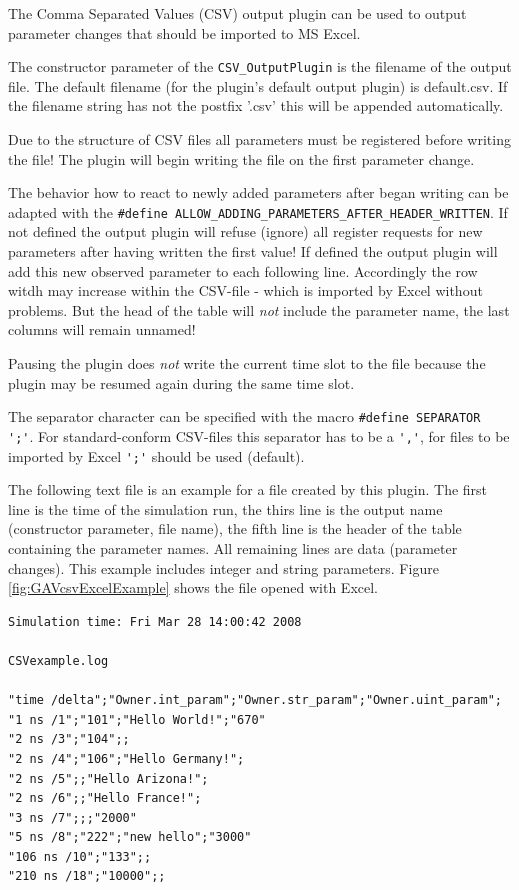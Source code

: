 The Comma Separated Values (CSV) output plugin can be used to output parameter changes that should be imported to MS Excel.

The constructor parameter of the \lstinline|CSV_OutputPlugin| is the filename of the output file. The default filename (for the plugin's default output plugin) is {\sffamily default.csv}. If the filename string has not the postfix '{\sffamily .csv}' this will be appended automatically.

    Due to the structure of CSV files all parameters must be registered before
    writing the file! The plugin will begin writing the file on the first parameter change.

    The behavior how to react to newly added parameters after began writing can be
    adapted with the \lstinline[language=TeX]|#define ALLOW_ADDING_PARAMETERS_AFTER_HEADER_WRITTEN|.
    If not defined the output plugin will refuse (ignore) all register requests 
    for new parameters after having written the first value! If defined the output
    plugin will add this new observed parameter to each following line. Accordingly
    the row witdh may increase within the CSV-file - which is imported by Excel without
    problems. But the head of the table will \emph{not} include the parameter name, 
    the last columns will remain unnamed!
   
    Pausing the plugin does {\em not} write the current time slot to the file because the
    plugin may be resumed again during the same time slot.

    The separator character can be specified with the macro \lstinline[language=TeX]|#define SEPARATOR ';'|.
    For standard-conform CSV-files this separator has to be a \lstinline[language=TeX]|','|, 
    for files to be imported by Excel \lstinline[language=TeX]|';'| should be used (default).
    
    The following text file is an example for a file created by this plugin. The first line is the time of the simulation run, the thirs line is the output name (constructor parameter, file name), the fifth line is the header of the table containing the parameter names. All remaining lines are data (parameter changes). This example includes integer and string parameters. Figure \ref{fig:GAVcsvExcelExample} shows the file opened with Excel.

\noindent
\begin{minipage}{\textwidth}
\begin{lstlisting}[language=TeX, caption={CSV output file example}]
Simulation time: Fri Mar 28 14:00:42 2008

CSVexample.log
 
"time /delta";"Owner.int_param";"Owner.str_param";"Owner.uint_param";
"1 ns /1";"101";"Hello World!";"670"
"2 ns /3";"104";;
"2 ns /4";"106";"Hello Germany!";
"2 ns /5";;"Hello Arizona!";
"2 ns /6";;"Hello France!";
"3 ns /7";;;"2000"
"5 ns /8";"222";"new hello";"3000"
"106 ns /10";"133";;
"210 ns /18";"10000";;
\end{lstlisting}
\end{minipage}

